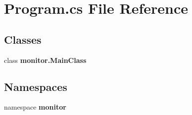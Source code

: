 \section{Program.\+cs File Reference}
\label{_program_8cs}
\subsection*{Classes}
\begin{DoxyCompactItemize}
\item 
class \textbf{ monitor.\+Main\+Class}
\end{DoxyCompactItemize}
\subsection*{Namespaces}
\begin{DoxyCompactItemize}
\item 
namespace \textbf{ monitor}
\end{DoxyCompactItemize}
